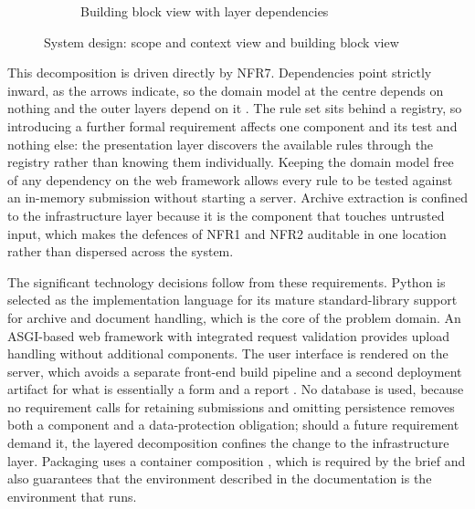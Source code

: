 \documentclass[a4paper,11pt]{article}
\begin{document}
\begin{figure}[H]
\begin{subfigure}{\textwidth}
\caption{Building block view with layer dependencies}
\label{fig:blocks}
\end{subfigure}
\caption{System design: scope and context view and building block view}
\label{fig:design}
\end{figure}

This decomposition is driven directly by NFR7. Dependencies point strictly
inward, as the arrows indicate, so the domain model at the centre depends on
nothing and the outer layers depend on it \citep{Percival2020, Richards2020}. The rule set sits behind
a registry, so introducing a further formal requirement affects one component
and its test and nothing else: the presentation layer discovers the available
rules through the registry rather than knowing them individually. Keeping the
domain model free of any dependency on the web framework allows every rule to be
tested against an in-memory submission without starting a server. Archive
extraction is confined to the infrastructure layer because it is the component
that touches untrusted input, which makes the defences of NFR1 and NFR2
auditable in one location rather than dispersed across the system.

The significant technology decisions follow from these requirements. Python is
selected as the implementation language for its mature standard-library support
for archive and document handling, which is the core of the problem domain. An
ASGI-based web framework with integrated request validation \citep{FastAPI2025}
provides upload handling without additional components. The user interface is
rendered on the server, which avoids a separate front-end build pipeline and a
second deployment artifact for what is essentially a form and a report
\citep{Richards2020}. No database is used, because no requirement calls for
retaining submissions and omitting persistence removes both a component and a
data-protection obligation; should a future requirement demand it, the layered
decomposition confines the change to the infrastructure layer. Packaging uses a
container composition \citep{Docker2024}, which is required by the brief and
also guarantees that the environment described in the documentation is the
environment that runs.
\end{document}
